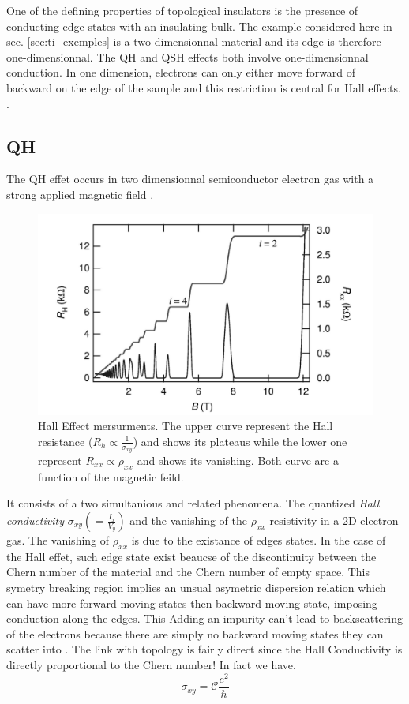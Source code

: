 One of the defining properties of topological insulators is the presence of conducting edge states with an insulating bulk. The example considered here in sec. \ref{sec:ti_exemples} is a two dimensionnal material and its edge is therefore one-dimensionnal. The QH and QSH effects both involve one-dimensionnal conduction. In one dimension, electrons can only either move forward of backward on the edge of the sample and this restriction is central for Hall effects. \cite{qi_quantum_2010}. 
\subsection{QH}
The QH effet occurs in two dimensionnal semiconductor electron gas with a strong applied magnetic field \cite{qi_quantum_2010}.

\begin{figure}[h]
    \includegraphics[width=\columnwidth]{sections/visuel/Hall_effect.png}
    \caption{Hall Effect mersurments. The upper curve represent the Hall resistance ($R_h \propto \frac{1}{\sigma_{xy}}$) and shows its plateaus while the lower one represent $R_{xx} \propto \rho_{xx}$ and shows its vanishing. Both curve are a function of the magnetic feild. \cite{jeckelmann_quantum_nodate}}
    \label{fig:Hall_effet}
\end{figure}

It consists of a two simultanious and related phenomena. The quantized \textit{Hall conductivity} $\sigma_{xy}(=\frac{I_x}{V_y})$ and the vanishing of the $\rho_{xx}$ resistivity in a 2D electron gas. The vanishing of $\rho_{xx}$ is due to the existance of edges states.%
In the case of the Hall effet, such edge state exist beaucse of the discontinuity between the Chern number of the material and the Chern number of empty space. This symetry breaking region implies an unsual asymetric dispersion relation which can have more forward moving states then backward moving state, imposing conduction along the edges. This
Adding an impurity can't lead to backscattering of the electrons because there are simply no backward moving states they can scatter into \cite{qi_quantum_2010}.  The link with topology is fairly direct since the Hall Conductivity is directly proportional to the Chern number! In fact we have.
\begin{equation}
\sigma_{xy} = \mathcal{C}\frac{e^2}{\hbar}
\end{equation}

